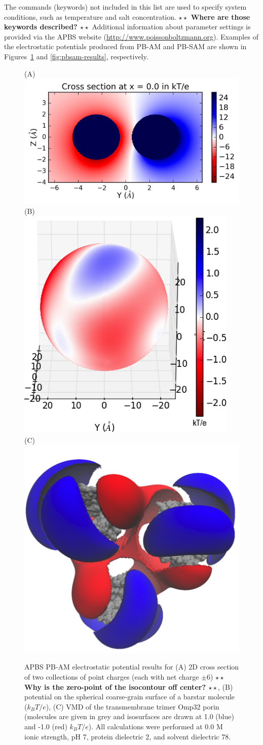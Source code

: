 \documentclass[11pt,titlepage]{article}
\newcommand{\todo}[1]{\textbf{$\star \star$ {#1} $\star \star$}}
\begin{document}
The commands (keywords) not included in this list are used to specify system conditions, such as temperature and salt concentration. \todo{Where are those keywords described?}
Additional information about parameter settings is provided via the APBS website (\url{http://www.poissonboltzmann.org}).
Examples of the electrostatic potentials produced from PB-AM and PB-SAM are shown in Figures~\ref{fig:pbam-results} and \ref{fig:pbsam-results}, respectively.
\begin{figure}
	\centering
	(A)~\includegraphics[width=0.40\linewidth]{pbam_toy} 
	(B)~\includegraphics[width=0.23\linewidth]{pbam_barstar} 
	(C)~\includegraphics[width=0.23\linewidth]{pbam_porin}
	\caption{APBS PB-AM electrostatic potential results for
		(A) 2D cross section of two collections of point charges (each with net charge \(\pm 6 \)) \todo{Why is the zero-point of the isocontour off center?},
		(B) potential on the spherical coarse-grain surface of a barstar molecule (\(k_BT/e\)), 
		(C) VMD \cite{Humphrey1996} of the transmembrane trimer Omp32 porin (molecules are given in grey and isosurfaces are drawn at 1.0 (blue) and -1.0 (red) \(k_BT/e\)).
		All calculations were performed at 0.0 M ionic strength, pH 7, protein dielectric 2, and solvent dielectric 78.
	}
	\label{fig:pbam-results}
\end{figure}
\end{document}
